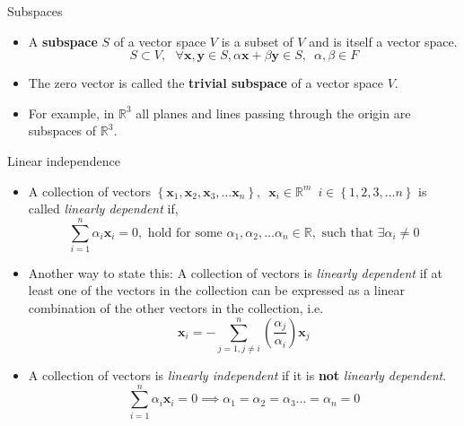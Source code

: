 \documentclass[aspectratio=169]{beamer}
\let\olditem\item
\renewcommand{\item}{\setlength{\itemsep}{\fill}\olditem}
\begin{document}
\begin{frame}[t]{Subspaces}
\begin{itemize}
    \item A \textbf{subspace} $S$ of a vector space $V$ is a subset of $V$ and is itself a vector space.
    \[ S \subset V, \,\,\,\, \forall \mathbf{x}, \mathbf{y} \in S, \alpha \mathbf{x} + \beta \mathbf{y} \in S, \,\,\, \alpha, \beta \in F \]
    \item The zero vector is called the \textbf{trivial subspace} of a vector space $V$.
    \item For example, in $\mathbb{R}^3$ all planes and lines passing through the origin are subspaces of $\mathbb{R}^3$. 
\end{itemize}
\begin{center}
\end{center}
\end{frame}


\begin{frame}[t]{Linear independence}
\begin{itemize}
  \item A collection of vectors $\left\{\mathbf{x}_1, \mathbf{x}_2, \mathbf{x}_3, \ldots \mathbf{x}_n\right\}, \,\,\, \mathbf{x}_i \in \mathbb{R}^m \,\,\, i \in\left\{1, 2, 3, \ldots n\right\}$ is called \textit{linearly dependent} if,
  $$ \sum_{i=1}^n\alpha_i\mathbf{x}_i = 0, \text{ hold for some } \alpha_1, \alpha_2, \ldots \alpha_n \in \mathbb{R}, \text{ such that } \exists \alpha_i \neq 0 $$
  
  \item Another way to state this: A collection of vectors is \textit{linearly dependent} if at least one of the vectors in the collection can be expressed as a linear combination of the other vectors in the collection, i.e.
  $$\mathbf{x}_i = -\sum_{j=1, j\neq i}^{n}\left(\frac{\alpha_j}{\alpha_i}\right)\mathbf{x}_j$$
  
  \item A collection of vectors is \textit{linearly independent} if it is \textbf{not} \textit{linearly dependent}.
  $$ \sum_{i=1}^n\alpha_i\mathbf{x}_i = 0 \implies \alpha_1=\alpha_2=\alpha_3\ldots=\alpha_n = 0$$
\end{itemize}
\end{frame}
\end{document}
